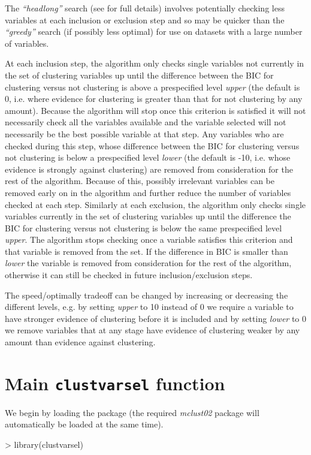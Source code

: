 \documentclass[,12pt]{article}
\newcommand{\Rfunction}[1]{{\texttt{#1}}}
\newcommand{\Rpackage}[1]{{\textit{#1}}}
\newcommand{\Rfunarg}[1]{{\textit{#1}}}
\begin{document}
The \Rfunarg{``headlong''} search (see  for full details) involves potentially checking less variables at each inclusion or exclusion step and so may be quicker than the \Rfunarg{``greedy''} search (if possibly less optimal) for use on datasets with a large number of variables. 

At each inclusion step, the algorithm only checks single variables not currently in the set of clustering variables up until the difference between the BIC for clustering versus not clustering is above a prespecified level \Rfunarg{upper} (the default is 0, i.e. where evidence for clustering is greater than that for not clustering by any amount). Because the algorithm will stop once this criterion is satisfied it will not necessarily check all the variables available and the variable selected will not necessarily be the best possible variable at that step. Any variables who are checked during this step, whose difference between the BIC for clustering versus not clustering is below a prespecified level \Rfunarg{lower} (the default is -10, i.e. whose evidence is strongly against clustering) are removed from consideration for the rest of the algorithm. Because of this, possibly irrelevant variables can be removed early on in the algorithm and further reduce the number of variables checked at each step. Similarly at each exclusion, the algorithm only checks single variables currently in the set of clustering variables up until the difference the BIC for clustering versus not clustering is below the same prespecified level \Rfunarg{upper}. The algorithm stops checking once a variable satisfies this criterion and that variable is removed from the set. If the difference in BIC is smaller than \Rfunarg{lower} the variable is removed from consideration for the rest of the algorithm, otherwise it can still be checked in future inclusion/exclusion steps. 

The speed/optimally tradeoff can be changed by increasing or decreasing the different levels, e.g. by setting \Rfunarg{upper} to 10 instead of 0 we require a variable to have stronger evidence of clustering before it is included and by setting \Rfunarg{lower} to 0 we remove variables that at any stage have evidence of clustering weaker by any amount than evidence against clustering.

\section{Main \Rfunction{clustvarsel} function}
We begin by loading the package (the required \Rpackage{mclust02} package will automatically be loaded at the same time).
\begin{Schunk}
\begin{Sinput}
> library(clustvarsel)
\end{Sinput}
\end{Schunk}
\end{document}
